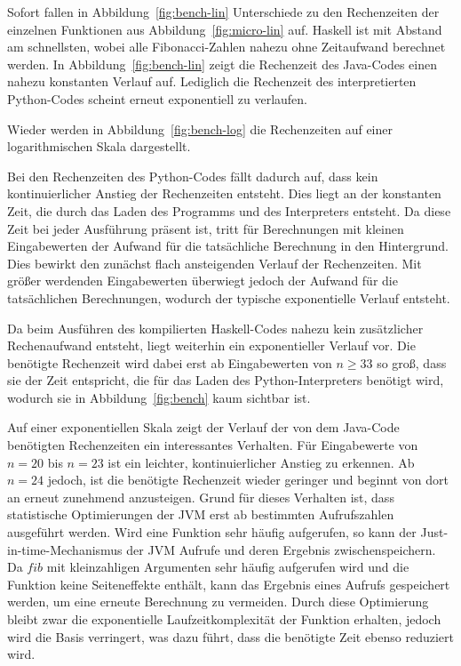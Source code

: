 \documentclass[11pt, parskip=half]{scrartcl}       %
\begin{document}
Sofort fallen in Abbildung~\ref{fig:bench-lin} Unterschiede zu den Rechenzeiten der einzelnen Funktionen aus Abbildung~\ref{fig:micro-lin} auf.
Haskell ist mit Abstand am schnellsten, wobei alle Fibonacci-Zahlen nahezu ohne Zeitaufwand berechnet werden.
In Abbildung~\ref{fig:bench-lin} zeigt die Rechenzeit des Java-Codes einen nahezu konstanten Verlauf auf.
Lediglich die Rechenzeit des interpretierten Python-Codes scheint erneut exponentiell zu verlaufen.

Wieder werden in Abbildung~\ref{fig:bench-log} die Rechenzeiten auf einer logarithmischen Skala dargestellt.

Bei den Rechenzeiten des Python-Codes fällt dadurch auf, dass kein kontinuierlicher Anstieg der Rechenzeiten entsteht.
Dies liegt an der konstanten Zeit, die durch das Laden des Programms und des Interpreters entsteht.
Da diese Zeit bei jeder Ausführung präsent ist, tritt für Berechnungen mit kleinen Eingabewerten der Aufwand für die tatsächliche Berechnung in den Hintergrund.
Dies bewirkt den zunächst flach ansteigenden Verlauf der Rechenzeiten.
Mit größer werdenden Eingabewerten überwiegt jedoch der Aufwand für die tatsächlichen Berechnungen, wodurch der typische exponentielle Verlauf entsteht.

Da beim Ausführen des kompilierten Haskell-Codes nahezu kein zusätzlicher Rechenaufwand entsteht, liegt weiterhin ein exponentieller Verlauf vor.
Die benötigte Rechenzeit wird dabei erst ab Eingabewerten von $n \ge 33$ so groß, dass sie der Zeit entspricht, die für das Laden des Python-Interpreters benötigt wird, wodurch sie in Abbildung~\ref{fig:bench} kaum sichtbar ist.

Auf einer exponentiellen Skala zeigt der Verlauf der von dem Java-Code benötigten Rechenzeiten
ein interessantes Verhalten.
Für Eingabewerte von $n = 20$ bis $n = 23$ ist ein leichter, kontinuierlicher Anstieg zu erkennen.
Ab $n = 24$ jedoch, ist die benötigte Rechenzeit wieder geringer und beginnt von dort an erneut zunehmend anzusteigen.
Grund für dieses Verhalten ist, dass statistische Optimierungen der JVM erst ab bestimmten Aufrufszahlen ausgeführt werden.
Wird eine Funktion sehr häufig aufgerufen, so kann der Just-in-time-Mechanismus der JVM Aufrufe und deren Ergebnis zwischenspeichern.
Da $fib$ mit kleinzahligen Argumenten sehr häufig aufgerufen wird und die Funktion keine Seiteneffekte enthält, kann das Ergebnis eines Aufrufs gespeichert werden, um eine erneute Berechnung zu vermeiden.
Durch diese Optimierung bleibt zwar die exponentielle Laufzeitkomplexität der Funktion erhalten, jedoch wird die Basis verringert, was dazu führt, dass die benötigte Zeit ebenso reduziert wird.
\end{document}
